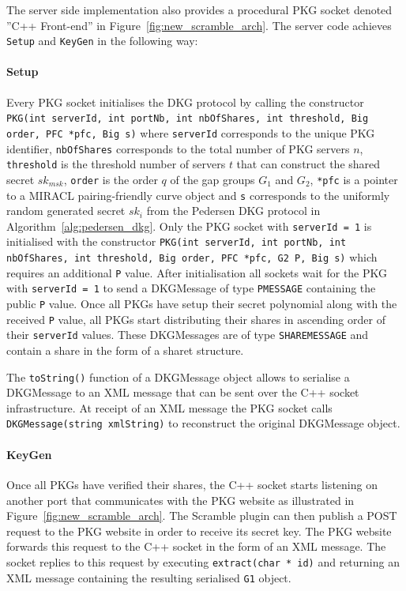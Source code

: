 The server side implementation also provides a procedural PKG socket denoted ''C++ Front-end'' in Figure~\ref{fig:new_scramble_arch}. The server code achieves \texttt{Setup} and \texttt{KeyGen} in the following way:

\paragraph{Setup} Every PKG socket initialises the DKG protocol by calling the constructor \texttt{PKG(int serverId, int portNb, int nbOfShares, int threshold, Big order, PFC *pfc, Big s)} where \texttt{serverId} corresponds to the unique PKG identifier, \texttt{nbOfShares} corresponds to the total number of PKG servers $n$, \texttt{threshold} is the threshold number of servers $t$ that can construct the shared secret $sk_{msk}$, \texttt{order} is the order $q$ of the gap groups $G_1$ and $G_2$, \texttt{*pfc} is a pointer to a MIRACL pairing-friendly curve object and \texttt{s} corresponds to the uniformly random generated secret $sk_i$ from the Pedersen DKG protocol in Algorithm~\ref{alg:pedersen_dkg}. Only the PKG socket with \texttt{serverId = 1} is initialised with the constructor \texttt{PKG(int serverId, int portNb, int nbOfShares, int threshold, Big order, PFC *pfc, G2 P, Big s)} which requires an additional \texttt{P} value. After initialisation all sockets wait for the PKG with \texttt{serverId = 1} to send a DKGMessage of type \texttt{P\textunderscore MESSAGE} containing the public \texttt{P} value. Once all PKGs have setup their secret polynomial along with the received \texttt{P} value, all PKGs start distributing their shares in ascending order of their \texttt{serverId} values. These DKGMessages are of type \texttt{SHARE\textunderscore MESSAGE} and contain a share in the form of a share\textunderscore t structure.

The \texttt{toString()} function of a DKGMessage object allows to serialise a DKGMessage to an XML message that can be sent over the C++ socket infrastructure. At receipt of an XML message the PKG socket calls \texttt{DKGMessage(string xmlString)} to reconstruct the original DKGMessage object.

\paragraph{KeyGen} Once all PKGs have verified their shares, the C++ socket starts listening on another port that communicates with the PKG website as illustrated in Figure~\ref{fig:new_scramble_arch}. The Scramble plugin can then publish a POST request to the PKG website in order to receive its secret key. The PKG website forwards this request to the C++ socket in the form of an XML message. The socket replies to this request by executing \texttt{extract(char * id)} and returning an XML message containing the resulting serialised \texttt{G1} object.


